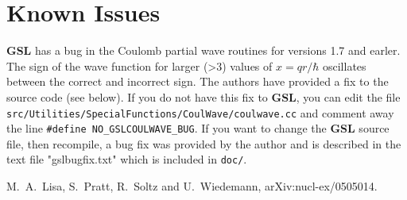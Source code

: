 \documentclass[10pt]{article}
\begin{document}
\section{Known Issues}

{\bf GSL} has a bug in the Coulomb partial wave routines for versions 1.7 and earler. The sign of the wave function for larger (>3) values of $x=qr/\hbar$ oscillates between the correct and incorrect sign. The authors have provided a fix to the source code (see below). If you do not have this fix to {\bf GSL}, you can edit the file {\tt src/Utilities/SpecialFunctions/CoulWave/coulwave.cc} and comment away the line {\tt \#define NO\_GSLCOULWAVE\_BUG}. If you want to change the {\bf GSL} source file, then recompile, a bug fix was provided by the author and is described in the text file "gslbugfix.txt" which is included in  {\tt doc/}.

\begin{thebibliography}{99}
M.~A.~Lisa, S.~Pratt, R.~Soltz and U.~Wiedemann,
  arXiv:nucl-ex/0505014.
\end{thebibliography}
\end{document}
